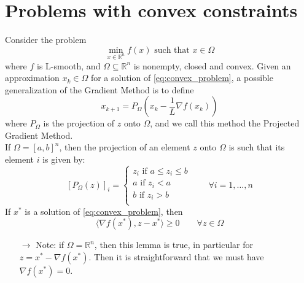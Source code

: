 \documentclass[12pt, openany]{report}
\theoremstyle{definition}
\begin{document}
\section{Problems with convex constraints}
Consider the problem
\begin{equation}\label{eq:convex_problem}
    \min_{x\in \mathbb{R}^n} f(x) \text{ such that } x\in \Omega
\end{equation}
where \(f\) is L-smooth, and \(\Omega \subseteq \mathbb{R}^n\) is nonempty, closed and convex.
Given an approximation \(x_k\in \Omega\) for a solution of \ref{eq:convex_problem}, a possible generalization of the Gradient Method is to define 
\begin{equation}
    x_{k+1} = P_{\Omega} \left(x_k-\frac{1}{L}\nabla f(x_k)\right)
\end{equation}
where \(P_{\Omega}\) is the projection of \(z\) onto \(\Omega\), and we call this method the Projected Gradient Method.\\
If \(\Omega = [a,b]^n\), then the projection of an element \(z\) onto \(\Omega\) is such that its element \(i\) is given by:
\begin{equation}
    \left[P_\Omega(z)\right]_i = \begin{cases}
        z_i \text{ if } a\le z_i\le b\\
        a \text{ if } z_i<a\\
        b \text{ if }z_i>b\\
    \end{cases} \qquad \forall i=1,\dots,n
\end{equation}
If \(x^*\) is a solution of \eqref{eq:convex_problem}, then \[\langle \nabla f(x^*),z-x^*\rangle \ge 0\qquad \forall z \in \Omega\]
\begin{itemize}
    \item [\(\rightarrow\)] Note: if \(\Omega = \mathbb{R}^n\), then this lemma is true, in particular for \(z=x^*-\nabla f(x^*)\). Then it is straightforward that we must have \(\nabla f(x^*)=0\). 
\end{itemize}
\end{document}
